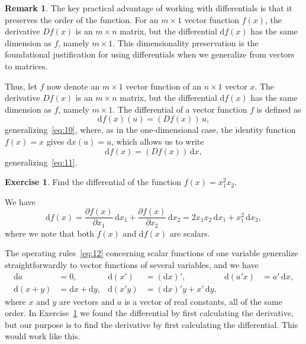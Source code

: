 \documentclass[12pt,a4paper]{article}
\makeatletter
\theoremstyle{definition}
\newtheorem{remark}{Remark}
\newtheorem{exercise}{Exercise}
\renewenvironment{proof}[1][\proofname]{\par
  \pushQED{\qed}%
  \normalfont \topsep6\p@\@plus6\p@\relax
  \trivlist
  \item[\hskip\labelsep\bfseries #1\@addpunct{.}]\ignorespaces
}{%
  \popQED\endtrivlist\@endpefalse
}
\newenvironment{solution}{%
  \begin{proof}[Solution]%
}{%
  \end{proof}%
}
\newcommand{\dd}{\mathrm{d}}
\makeatother
\begin{document}
\begin{remark}\label{rem:diff_dim}
The key practical advantage of working with differentials is that it preserves the order of the function. For an $m \times 1$ vector function $f(x)$, the derivative $Df(x)$ is an $m \times n$ matrix, but the differential $\dd f(x)$ has the same dimension as $f$, namely $m \times 1$. This dimensionality preservation is the foundational justification for using differentials when we generalize from vectors to matrices.
\end{remark}

Thus, let $f$ now denote an $m \times 1$ vector function of an $n \times 1$ vector $x$. The derivative $Df(x)$ is an $m \times n$ matrix, but the differential $\dd f(x)$ has the same dimension as $f$, namely $m \times 1$. The differential of a vector function $f$ is defined as
\begin{equation}\label{eq:15}
\dd f(x)(u) = (Df(x))\, u,
\end{equation}
generalizing~\eqref{eq:10}, where, as in the one-dimensional case, the identity function $f(x) = x$ gives $\dd x(u) = u$, which allows us to write
\begin{equation}\label{eq:16}
\dd f(x) = (Df(x))\, \dd x,
\end{equation}
generalizing~\eqref{eq:11}. %

\begin{exercise}\label{exer:9}
Find the differential of the function $f(x) = x_1^2 x_2$.
\end{exercise}

\begin{solution}
We have
\[
\dd f(x) = \frac{\partial f(x)}{\partial x_1}\, \dd x_1 + \frac{\partial f(x)}{\partial x_2}\, \dd x_2
= 2x_1 x_2\, \dd x_1 + x_1^2\, \dd x_2,
\]
where we note that both $f(x)$ and $\dd f(x)$ are scalars. %
\end{solution}

The operating rules~\eqref{eq:12} concerning scalar functions of one variable generalize straightforwardly to vector functions of several variables, and we have
\begin{equation}\label{eq:17}
\begin{aligned}
\dd a &= 0, & \dd(x') &= (\dd x)', & \dd(a'x) &= a'\, \dd x, \\
\dd(x+y) &= \dd x + \dd y, & \dd(x'y) &= (\dd x)'y + x'\, \dd y,
\end{aligned}
\end{equation}
where $x$ and $y$ are vectors and $a$ is a vector of real constants, all of the same order. In Exercise~\ref{exer:9} we found the differential by first calculating the derivative, but our purpose is to find the derivative by first calculating the differential. This would work like this. %
\end{document}
